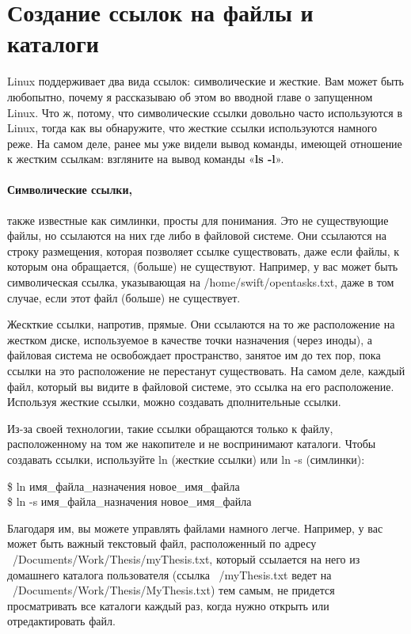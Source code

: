 \documentclass[12pt]{book}
\begin{document}
\section{Создание ссылок на файлы и каталоги}

Linux поддерживает два вида ссылок: символические и жесткие. Вам может быть любопытно, почему я рассказываю об этом во вводной главе о запущенном Linux. Что ж, потому, что символические ссылки довольно часто используются в Linux, тогда как вы обнаружите, что жесткие ссылки используются намного реже. На самом деле, ранее мы уже видели вывод команды, имеющей отношение к жестким ссылкам: взгляните на вывод команды «\textbf{ls -l}».

\paragraph{Символические ссылки,}также известные как симлинки, просты для понимания. Это не существующие файлы, но ссылаются на них где либо в файловой системе. Они ссылаются на строку размещения, которая позволяет ссылке существовать, даже если файлы, к которым она обращается, (больше) не существуют. Например, у вас может быть символическая ссылка, указывающая на /home/swift/\break{}opentasks.txt, даже в том случае, если этот файл (больше) не существует.

Жескткие ссылки, напротив, прямые. Они ссылаются на то же расположение на жестком диске, используемое в качестве точки назначения (через иноды), а файловая система не освобождает пространство, занятое им до тех пор, пока ссылки на это расположение не перестанут существовать. На самом деле, каждый файл, который вы видите в файловой системе, это ссылка на его расположение. Используя жесткие ссылки, можно создавать дполнительные ссылки.

Из-за своей технологии, такие ссылки обращаются только к файлу, расположенному на том же накопителе и не воспринимают каталоги. 
Чтобы создавать ссылки, используйте ln (жесткие ссылки) или ln -s (симлинки):

\vspace{3mm}
\begin{tcolorbox}
\$ ln имя\_файла\_назначения новое\_имя\_файла \\
\$ ln -s имя\_файла\_назначения новое\_имя\_файла
\end{tcolorbox}

Благодаря им, вы можете управлять файлами намного легче. Например, у вас может быть важный текстовый файл, расположенный по адресу  ~/Documents/Work/\break{}Thesis/myThesis.txt, который ссылается на него из домашнего каталога пользователя (ссылка ~/myThesis.txt ведет на ~/Documents/Work/Thesis/MyThesis.txt) тем самым, не придется просматривать все каталоги каждый раз, когда нужно открыть или отредактировать файл. 
\end{document}
